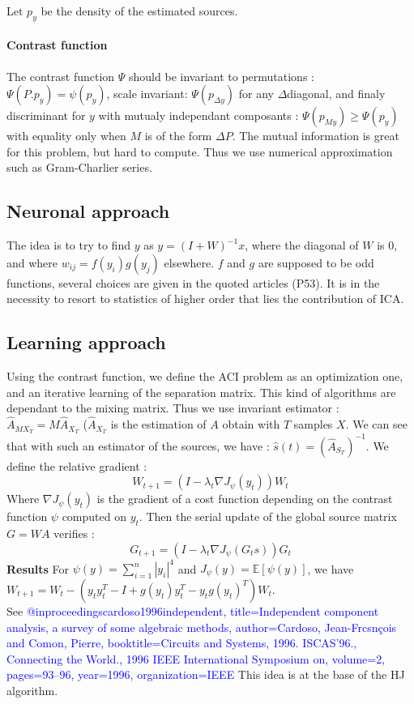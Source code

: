 \documentclass[a4paper,11pt,titlepage]{article}
\begin{document}
Let $p_y$ be the density of the estimated sources.
\paragraph{Contrast function} The contrast function $\Psi$ should be invariant to permutations : $\Psi(P.p_y) = \psi(p_y)$, scale invariant: $\Psi(p_{\Delta y})$ for any $\Delta$diagonal, and finaly discriminant for $y$ with mutualy independant composants : $\Psi(p_{My}) \geq \Psi(p_y)$ with equality only when $M$ is of the form $\Delta P$.
The mutual information is great for this problem, but hard to compute. Thus we use numerical approximation such as Gram-Charlier series.

\subsection{Neuronal approach}
The idea is to try to find $y$ as $y = (I+W)^{-1}x$, where the diagonal of $W$ is 0, and where $w_{ij} = f(y_i)g(y_j)$ elsewhere. $f$ and $g$ are supposed to be odd functions, several choices are given in the quoted articles (P53).
It is in the necessity to resort to statistics of higher order that lies the contribution of ICA.

\subsection{Learning approach}
\label{LA}
Using the contrast function, we define the ACI problem as an optimization one, and an iterative learning of the separation matrix. This kind of algorithms are dependant to the mixing matrix. Thus we use invariant estimator : $\hat{A}_{MX_T}=M\hat{A}_{X_T}$ ($\hat{A}_{X_T}$ is the estimation of $A$ obtain with $T$ samples $X$. We can see that with such an estimator of the sources, we have : $\hat{s}(t) = (\hat{A}_{S_T})^{-1}$.
We define the relative gradient :
\begin{equation*}
	W_{t+1} = (I - \lambda_t\nabla J_\psi(y_t))W_t
\end{equation*}
Where $\nabla J_\psi(y_t)$ is the gradient of a cost function depending on the contrast function $\psi$ computed on $y_t$. Then the serial update of the global source matrix $G =WA$ verifies :
\begin{equation*}
	G_{t+1} = (I - \lambda_t\nabla J_\psi(G_ts))G_t
\end{equation*}
\textbf{Results} For $\psi(y) = \sum\limits_{i=1}^n |y_i|^4$ and $J_\psi(y) = \mathds{E}[\psi(y)]$, we have $W_{t+1} = W_t -(y_t y_t^T-I+g(y_t)y_t^T- y_t g(y_t)^T)W_t$. \\
See \textcolor{blue}{@inproceedings{cardoso1996independent,
	  title={Independent component analysis, a survey of some algebraic methods},
	    author={Cardoso, Jean-Frcsn{\c{c}}ois and Comon, Pierre},
		  booktitle={Circuits and Systems, 1996. ISCAS'96., Connecting the World., 1996 IEEE International Symposium on},
		    volume={2},
			  pages={93--96},
			    year={1996},
				  organization={IEEE}
			  }
}
This idea is at the base of the HJ algorithm.
\end{document}
